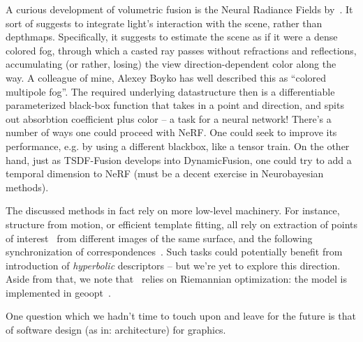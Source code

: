A curious development of volumetric fusion is the Neural Radiance Fields
by~\citet{nerf}. It sort of suggests to integrate light's interaction with the
scene, rather than depthmaps.  Specifically, it suggests to estimate the scene
as if it were a dense colored fog, through which a casted ray passes without
refractions and reflections, accumulating (or rather, losing) the view
direction-dependent color along the way. A colleague of mine, Alexey Boyko has
well described this as ``colored multipole fog''. The required underlying
datastructure then is a differentiable parameterized black-box function that
takes in a point and direction, and spits out absorbtion coefficient plus color
-- a task for a neural network!
There's a number of ways one could proceed with NeRF. One could seek to improve
its performance, e.g. by using a different blackbox, like a tensor train.  On
the other hand, just as TSDF-Fusion develops into DynamicFusion, one could try
to add a temporal dimension to NeRF (must be a decent exercise in Neurobayesian
methods).

The discussed methods in fact rely on more low-level machinery. For instance,
structure from motion, or efficient template fitting, all rely on extraction of
points of interest~\cite{r2d2} from different images of the same surface, and
the following synchronization of correspondences~\cite{birdalCorrespondences}.
Such tasks could potentially benefit from introduction of \emph{hyperbolic}
descriptors -- but we're yet to explore this direction. Aside from that, we
note that~\citet{birdalCorrespondences} relies on Riemannian optimization:
the model is implemented in geoopt~\cite{geoopt}.

One question which we hadn't time to touch upon and leave for the future is
that of software design (as in: architecture) for graphics.
